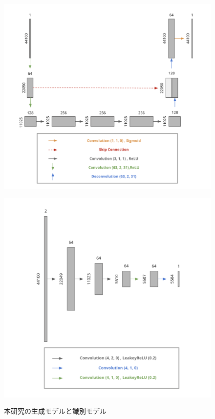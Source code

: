 \begin{figure}[b]
\centering
\begin{minipage}[b]{0.48\columnwidth}
\centering
\includegraphics[width=\columnwidth]{figure/pr_generator.png}
\label{fig:pr_gen}
\end{minipage}
\begin{minipage}[b]{0.48\columnwidth}
\centering
\includegraphics[width=\columnwidth]{figure/pr_discriminator.png}
\label{fig:pr_dis}
\end{minipage}
\caption{本研究の生成モデルと識別モデル}
\label{fig:pr}
\end{figure}


